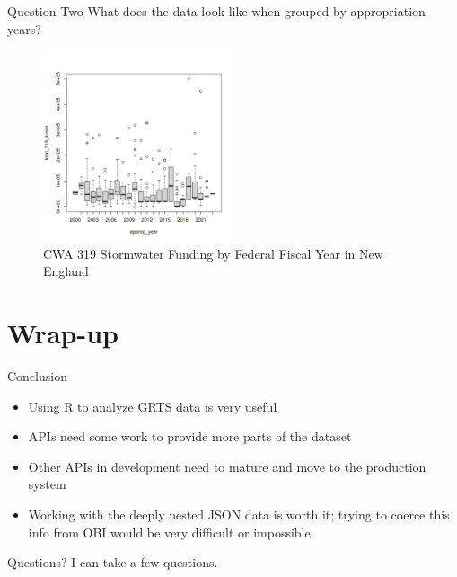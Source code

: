 \documentclass{beamer}
\begin{document}
\begin{frame}{Question Two}
  What does the data look like when grouped by appropriation years?
  \begin{figure}
    \centering
    \includegraphics[width=0.50\textwidth]{fundsByAppropYear.png}
    \caption{CWA 319 Stormwater Funding by Federal Fiscal Year in New England}
  \end{figure}
\end{frame}
	 
\section{Wrap-up}

\begin{frame}{Conclusion}
  \begin{itemize}
  \item Using R to analyze GRTS data is very useful
  \item APIs need some work to provide more parts of the dataset
  \item Other APIs in development need to mature and move to the
    production system
  \item Working with the deeply nested JSON data is worth it; trying
    to coerce this info from OBI would be very difficult or
    impossible.
  \end{itemize}
\end{frame}


\begin{frame}{Questions?}
  \centering
  I can take a few questions.
\end{frame}
 
\end{document}
